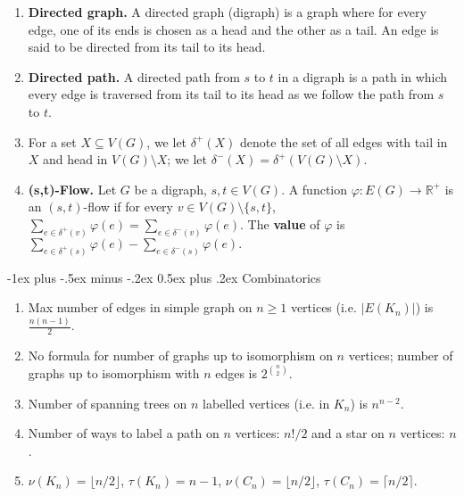 \documentclass[10pt,landscape]{article}
\makeatletter
\renewcommand{\section}{\@startsection{section}{1}{0mm}%
                                {-1ex plus -.5ex minus -.2ex}%
                                {0.5ex plus .2ex}%
                                {\normalfont\large\bfseries}}
\makeatother
\begin{document}
\begin{multicols}{3}
\begin{enumerate}
	\item \textbf{Directed graph.} A directed graph (digraph) is a graph where for every edge, one of its ends is chosen as a head and the other as a tail. An edge is said to be directed from its tail to its head.
	\item \textbf{Directed path.} A directed path from \( s \) to \( t \) in a digraph is a path in which every edge is traversed from its tail to its head as we follow the path from \( s \) to \( t \).
	\item For a set \( X \subseteq V(G) \), we let \( \delta ^{+} (X) \) denote the set of all edges with tail in \( X \) and head in \( V(G) \setminus X \); we let \( \delta ^{-} (X) = \delta ^{+} (V(G) \setminus X)  \).
	\item \textbf{(s,t)-Flow.} Let \( G \) be a digraph, \( s , t \in V(G) \). A function \( \varphi : E(G) \to \mathbb{R}^{+}  \) is an \( (s,t) \)-flow if for every \( v \in V(G) \setminus \{ s,t\}  \), \( \sum_{e \in \delta ^{+}(v) }^{}\varphi (e)= \sum_{e \in \delta ^{-} (v)}^{} \varphi (e) \). The \textbf{value} of \( \varphi  \) is \( \sum_{e \in \delta ^{+} (s)}^{}\varphi (e) - \sum_{e \in \delta ^{-} (s)}^{}\varphi (e). \)
\end{enumerate}
\section{Combinatorics}
\begin{enumerate}
	\item Max number of edges in simple graph on \( n \geq 1 \) vertices (i.e. \( |E(K_n)| \)) is \( \frac{n(n-1)}{2}  \).
	\item No formula for number of graphs up to isomorphism on \( n \) vertices; number of graphs up to isomorphism with \( n \) edges is \( 2^{\binom{n}{2} }  \).
	\item Number of spanning trees on \( n \) labelled vertices (i.e. in \( K_n \)) is \( n^{n-2}  \).
	\item Number of ways to label a path on \( n \) vertices: \( n! / 2 \) and a star on \( n \) vertices: \( n \).
	\item \( \nu(K_n) = \lfloor n / 2 \rfloor \), \( \tau (K_n) = n - 1 \), \( \nu (C_n) = \lfloor n / 2 \rfloor \), \( \tau (C_n) = \lceil n / 2 \rceil \).
	
	
	
	
	
\end{enumerate}

\end{multicols}
\end{document}
